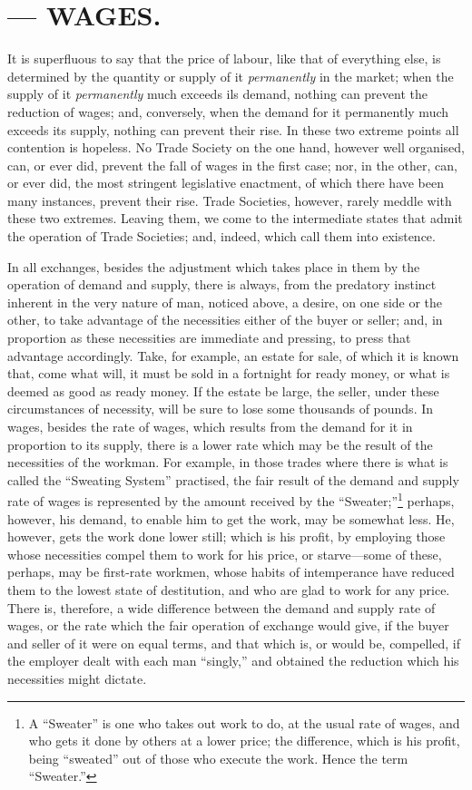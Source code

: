 \chapter{--- WAGES.} \label{WAGES}

It is superfluous to say that the price of labour, like that of
everything else, is determined by the quantity or supply of it
\textit{permanently} in the market; when the supply of it
\textit{permanently} much exceeds ils demand, nothing can prevent the
reduction of wages; and, conversely, when the demand for it permanently
much exceeds its supply, nothing can prevent their rise. In these two
extreme points all contention is hopeless. No Trade Society on the one
hand, however well organised, can, or ever did, prevent the fall of
wages in the first case; nor, in the other, can, or ever did, the most
stringent legislative enactment, of which there have been many
instances, prevent their rise. Trade Societies, however, rarely meddle
with these two extremes. Leaving them, we come to the intermediate
states that admit the operation of Trade Societies; and, indeed, which
call them into existence.

In all exchanges, besides the adjustment which takes place in them by
the operation of demand and supply, there is always, from the predatory
instinct inherent in the very nature of man, noticed above, a desire, on
one side or the other, to take advantage of the necessities either of
the buyer or seller; and, in proportion as these necessities are
immediate and pressing, to press that advantage accordingly. Take, for
example, an estate for sale, of which it is known that, come what will,
it must be sold in a fortnight for ready money, or what is deemed as
good as ready money. If the estate be large, the seller, under these
circumstances of necessity, will be sure to lose some thousands of
pounds. In wages, besides the rate of wages, which results from the
demand for it in proportion to its supply, there is a lower rate which
may be the result of the necessities of the workman. For example, in
those trades where there is what is called the ``Sweating System''
practised, the fair result of the demand and supply rate of wages is
represented by the amount received by the ``Sweater;''\footnote{A
``Sweater'' is one who takes out work to do, at the usual rate of wages,
and who gets it done by others at a lower price; the difference, which
is his profit, being ``sweated'' out of those who execute the work.
Hence the term ``Sweater.''} perhaps, however, his demand, to enable him
to get the work, may be somewhat less. He, however, gets the work done
lower still; which is his profit, by employing those whose necessities
compel them to work for his price, or starve---some of these, perhaps,
may be first-rate workmen, whose habits of intemperance have reduced
them to the lowest state of destitution, and who are glad to work for
any price. There is, therefore, a wide difference between the demand and
supply rate of wages, or the rate which the fair operation of exchange
would give, if the buyer and seller of it were on equal terms, and that
which is, or would be, compelled, if the employer dealt with each man
``singly,'' and obtained the reduction which his necessities might
dictate.

